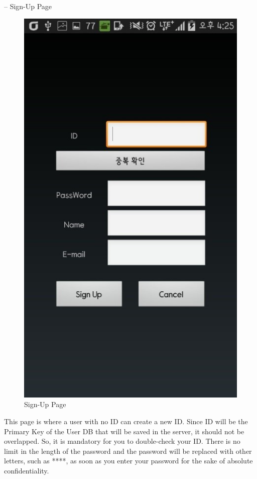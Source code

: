 \documentclass[conference]{IEEEtran}
\begin{document}
 -- Sign-Up Page\\
 
\begin{figure}[h]
\begin{center}
    \includegraphics[scale=1]{img_11}
    \caption{Sign-Up Page} 
\end{center}
\end{figure}

 This page is where a user with no ID can create a new ID. Since ID will be the Primary Key of the User DB that will be saved in the server, it should not be overlapped. So, it is mandatory for you to double-check your ID. There is  no limit in the length of the password and the password will be replaced with other letters, such as ****, as soon as you enter your password for the sake of absolute confidentiality.
\end{document}
